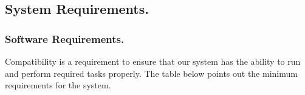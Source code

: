 \documentclass{article}
\begin{document}
\newpage
\subsection{System Requirements.}
\subsubsection{Software Requirements.}
Compatibility is a requirement to ensure that our system has the ability to run and perform required tasks properly. The table below points out the minimum requirements for the system.



\begin{table}[h]
    \caption{Software requirements of the system.}
    \label{tab:software-requirements-of-the-system}
    \renewcommand{\arraystretch}{1} %
\end{table}
\end{document}
